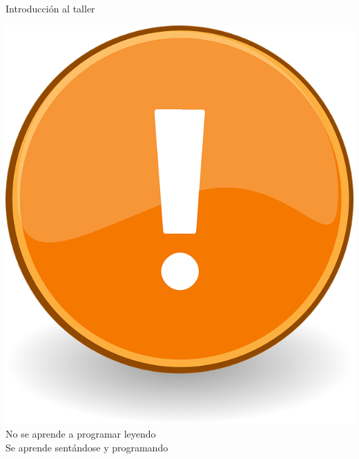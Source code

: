 \documentclass{bredelebeamer}
\begin{document}
\begin{frame}{Introducción al taller}
\begin{Huge}
\begin{center}
\includegraphics[scale=0.1]{images/exclamacion.png}
\\No se aprende a programar leyendo \\Se aprende sentándose y programando 
\end{center}
\end{Huge}
\end{frame}
\end{document}
